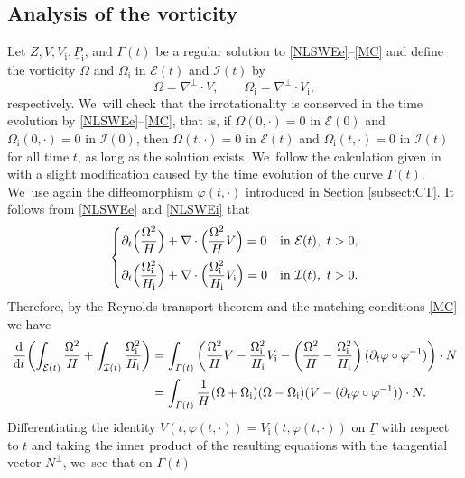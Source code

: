 \documentclass[JEP,XML,SOM,Unicode,NoFloatCountersInSection,published]{cedram}
\newcommand{\dt}{\partial_t}
\newcommand{\cI}{{\mathcal I}}
\newcommand{\cE}{{\mathcal E}}
\newcommand{\ul}[1]{\underline{#1}}
\newcommand{\itGamma}{\mathit{\Gamma}}
\theoremstyle{definition}
\begin{document}
\subsection{Analysis of the vorticity}\label{sectvort}
Let $Z,V,V_\mathrm{i},\ul{P}_\mathrm{i}$, and $\itGamma(t)$ be a regular solution to \eqref{NLSWEe}--\eqref{MC} and define the vorticity $\Omega$
and $\Omega_\mathrm{i}$ in $\cE(t)$ and $\cI(t)$ by
\[
\Omega = \nabla^\perp\cdot V, \qquad \Omega_\mathrm{i} = \nabla^\perp\cdot V_\mathrm{i},
\]
respectively. We~will check that the irrotationality is conserved in the time evolution by \eqref{NLSWEe}--\eqref{MC}, that is,
if $\Omega(0,\cdot)=0$ in $\cE(0)$ and $\Omega_\mathrm{i}(0,\cdot)=0$ in $\cI(0)$,
then $\Omega(t,\cdot)=0$ in $\cE(t)$ and $\Omega_\mathrm{i}(t,\cdot)=0$ in $\cI(t)$ for all time $t$, as long as the solution exists. We~follow the calculation given in \cite[Section 2.4]{IguchiLannes2023} with a slight modification caused by the time evolution of the curve $\itGamma(t)$. We~use again the diffeomorphism $\varphi(t,\cdot)$ introduced in Section \ref{subsect:CT}.
It follows from \eqref{NLSWEe} and \eqref{NLSWEi} that
\[
\begin{cases}
\dt\Bigl(\dfrac{\Omega^2}{H}\Bigr) + \nabla\cdot\Bigl(\dfrac{\Omega^2}{H}V\Bigr)=0 &\text{in } \cE(t), \ t>0, \\[8pt]
\dt\Bigl(\dfrac{\Omega_\mathrm{i}^2}{H_\mathrm{i}}\Bigr)
+ \nabla\cdot\Bigl(\dfrac{\Omega_\mathrm{i}^2}{H_\mathrm{i}}V_\mathrm{i}\Bigr)=0 &\text{in } \cI(t), \ t>0.
\end{cases}
\]
Therefore, by the Reynolds transport theorem and the matching conditions \eqref{MC} we have
\begin{align}
\frac{\rm d}{{\rm d}t}\biggl(\int_{\cE(t)}\frac{\Omega^2}{H} + \int_{\cI(t)}\frac{\Omega_\mathrm{i}^2}{H_\mathrm{i}} \biggr)
&= \int_{\itGamma(t)} \left(\frac{\Omega^2}{H}V - \frac{\Omega_\mathrm{i}^2}{H_\mathrm{i}}V_\mathrm{i}
- \left(\frac{\Omega^2}{H} - \frac{\Omega_\mathrm{i}^2}{H_\mathrm{i}} \right)(\dt\varphi\circ\varphi^{-1}) \right)\cdot N \notag\\
\label{vorticity}
\\[-15pt]
&= \int_{\itGamma(t)} \frac{1}{H}(\Omega+\Omega_\mathrm{i})(\Omega-\Omega_\mathrm{i})(V-(\dt\varphi\circ\varphi^{-1}))\cdot N.\notag
\end{align}
Differentiating the identity $V(t,\varphi(t,\cdot))=V_\mathrm{i}(t,\varphi(t,\cdot))$ on $\ul{\itGamma}$ with respect to $t$ and taking the inner product of the
resulting equations with the tangential vector $N^\perp$, we~see that on $\itGamma(t)$
\end{document}
